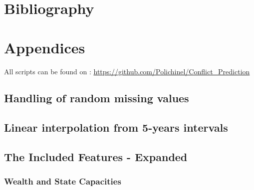 \documentclass[a4paper]{article}
\begin{document}




\pagebreak

\section{Bibliography}
 


\pagebreak
\section{Appendices}

All scripts can be found on : \hyperlink{https://github.com/Polichinel/Conflict_Prediction}{https://github.com/Polichinel/Conflict\_Prediction}

\subsection{Handling of random missing values}\label{missing}

\subsection{Linear interpolation from 5-years intervals}\label{interpolation}

\subsection{The Included Features - Expanded}\label{feature_expanded}


\subsubsection{Wealth and State Capacities}
\end{document}
